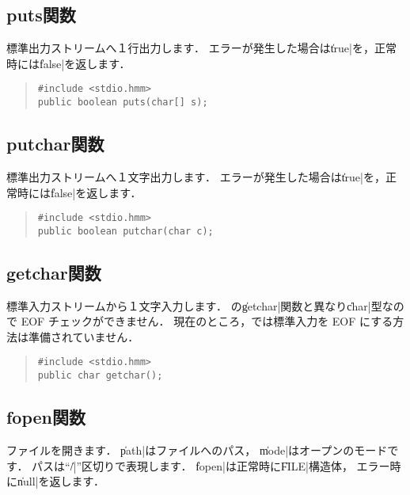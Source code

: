 \subsection{puts関数}

標準出力ストリームへ１行出力します．
エラーが発生した場合は\|true|を，正常時には\|false|を返します．

\begin{quote}
\begin{verbatim}
#include <stdio.hmm>
public boolean puts(char[] s);
\end{verbatim}
\end{quote}

\subsection{putchar関数}

標準出力ストリームへ１文字出力します．
エラーが発生した場合は\|true|を，正常時には\|false|を返します．

\begin{quote}
\begin{verbatim}
#include <stdio.hmm>
public boolean putchar(char c);
\end{verbatim}
\end{quote}

\subsection{getchar関数}

標準入力ストリームから１文字入力します．
\cl の\|getchar|関数と異なり\|char|型なので EOF チェックができません．
現在のところ，\tacos では標準入力を EOF にする方法は準備されていません．

\begin{quote}
\begin{verbatim}
#include <stdio.hmm>
public char getchar();
\end{verbatim}
\end{quote}

\subsection{fopen関数}

ファイルを開きます．
\|path|はファイルへのパス，
\|mode|はオープンのモードです．
パスは``\|/|''区切りで表現します．
\|fopen|は正常時に\|FILE|構造体，
エラー時に\|null|を返します．

